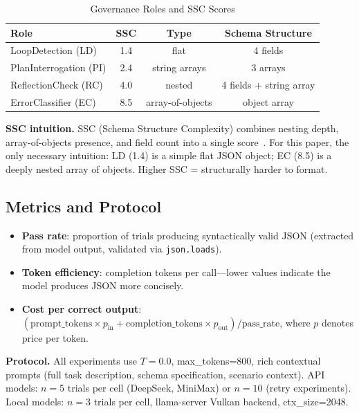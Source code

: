 \documentclass[11pt,a4paper]{article}
\begin{document}
\begin{table}[htbp]\centering\caption{Governance Roles and SSC Scores}\label{tab:roles}\small
\begin{tabular}{lccc}\toprule\textbf{Role} & \textbf{SSC} & \textbf{Type} & \textbf{Schema Structure}\\\midrule
LoopDetection (LD) & 1.4 & flat & 4 fields\\
PlanInterrogation (PI) & 2.4 & string arrays & 3 arrays\\
ReflectionCheck (RC) & 4.0 & nested & 4 fields + string array\\
ErrorClassifier (EC) & 8.5 & array-of-objects & object array\\\bottomrule
\end{tabular}
\end{table}

\textbf{SSC intuition.} SSC (Schema Structure Complexity) combines nesting depth, array-of-objects presence, and field count into a single score~\cite{chen2026empirical}. For this paper, the only necessary intuition: LD (1.4) is a simple flat JSON object; EC (8.5) is a deeply nested array of objects. Higher SSC = structurally harder to format.

\subsection{Metrics and Protocol}

\begin{itemize}[leftmargin=*]
\item \textbf{Pass rate}: proportion of trials producing syntactically valid JSON (extracted from model output, validated via \texttt{json.loads}).
\item \textbf{Token efficiency}: completion tokens per call---lower values indicate the model produces JSON more concisely.
\item \textbf{Cost per correct output}: $(\text{prompt\_tokens} \times p_{\text{in}} + \text{completion\_tokens} \times p_{\text{out}}) / \text{pass\_rate}$, where $p$ denotes price per token.
\end{itemize}

\textbf{Protocol.} All experiments use $T=0.0$, max\_tokens=800, rich contextual prompts (full task description, schema specification, scenario context). API models: $n=5$ trials per cell (DeepSeek, MiniMax) or $n=10$ (retry experiments). Local models: $n=3$ trials per cell, llama-server Vulkan backend, ctx\_size=2048.
\end{document}
